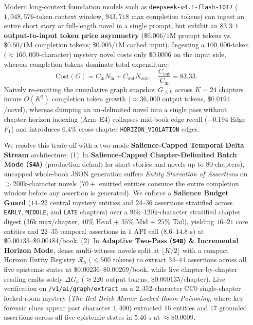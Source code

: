 \documentclass[11pt,twocolumn]{article}
\begin{document}
Modern long-context foundation models such as \texttt{deepseek-v4.1-flash-1017} ($1{,}048{,}576$-token context window, $943{,}718$ max completion tokens) can ingest an entire short story or full-length novel in a single prompt, but exhibit an \textbf{$83.3:1$ output-to-input token price asymmetry} ($\$0.006 / 1\text{M}$ prompt tokens vs.\ $\$0.50 / 1\text{M}$ completion tokens; $\$0.005 / 1\text{M}$ cached input). Ingesting a $100{,}000$-token ($\approx 160{,}000$-character) mystery novel costs only $\$0.0006$ on the input side, whereas completion tokens dominate total expenditure:
\begin{equation}
\text{Cost}(G) = C_{\text{in}} N_{\text{in}} + C_{\text{out}} N_{\text{out}}, \quad \frac{C_{\text{out}}}{C_{\text{in}}} = 83.33.
\label{eq:asymmetric_cost}
\end{equation}
Naively re-emitting the cumulative graph snapshot $G_{\le k}$ across $K = 24$ chapters incurs $O(K^2)$ completion token growth ($\approx 36{,}000$ output tokens, $\$0.0194$/novel), whereas dumping an un-delimited novel into a single pass without chapter horizon indexing (Arm~E4) collapses mid-book edge recall ($-0.194$ Edge $F_1$) and introduces $6.4\%$ cross-chapter \texttt{HORIZON\_VIOLATION} edges.

We resolve this trade-off with a two-mode \textbf{Salience-Capped Temporal Delta Stream} architecture: (1)~In \textbf{Salience-Capped Chapter-Delimited Batch Mode (\texttt{S4A})} (production default for short stories and novels up to $80$ chapters), uncapped whole-book JSON generation suffers \textit{Entity Starvation of Assertions} on $>200\text{k}$-character novels ($70+$ emitted entities consume the entire completion window before any assertion is generated). We enforce a \textbf{Salience Budget Guard} ($14\text{--}22$ central mystery entities and $24\text{--}36$ assertions stratified across \texttt{EARLY}, \texttt{MIDDLE}, and \texttt{LATE} chapters) over a $96\text{k--}120\text{k}$-character stratified chapter digest ($36\text{k}$ max/chapter, $40\%$ Head + $35\%$ Mid + $25\%$ Tail), yielding $16\text{--}21$ core entities and $22\text{--}35$ temporal assertions in $1$ API call ($8.6\text{--}14.8\text{ s}$) at $\$0.00133\text{--}\$0.00184$/book. (2)~In \textbf{Adaptive Two-Pass (\texttt{S4B}) \& Incremental Horizon Mode}, dense multi-witness novels split at $\lfloor K/2 \rfloor$ with a compact Horizon Entity Registry $\mathcal{R}_{h}$ ($\le 500$ tokens) to extract $34\text{--}44$ assertions across all five epistemic states at $\$0.00236\text{--}\$0.00269$/book, while live chapter-by-chapter reading emits solely $\Delta G_h$ ($\approx 220$ output tokens, $\$0.000135$/chapter). Live verification on \texttt{/v1/ai/graph/extract} on a $2{,}352$-character CC0 single-chapter locked-room mystery (\textit{The Red Brick Manor Locked-Room Poisoning}, where key forensic clues appear past character $1{,}400$) extracted $16$ entities and $17$ grounded assertions across all five epistemic states in $5.46\text{ s}$ at $\approx \$0.0009$.
\end{document}
